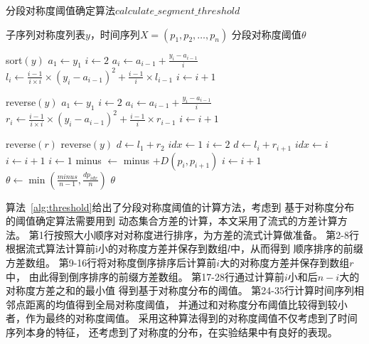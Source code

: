 \begin{algorithm}[t]
  \caption{分段对称度阈值确定算法$calculate\_segment\_threshold$}
  \label{alg:threshold}
  \small
  \begin{algorithmic}
    \REQUIRE 子序列对称度列表$y$，时间序列$X=\left(p_{1}, p_{2}, \dots, p_{n}\right)$
    \ENSURE 分段对称度阈值$\theta$

    \STATE sort$(y)$
    \STATE $a_1 \leftarrow y_1$
    \STATE $i \leftarrow 2$
    \STATE $a_i \leftarrow a_{i-1}+\frac{y_i-a_{i-1}}{i}$
    \STATE $l_i \leftarrow \frac{i-1}{i \times i} \times(y_i-a_{i-1})^{2}+\frac{i-1}{i} \times l_{i-1}$
    \STATE $i \leftarrow i+1$
    \ENDWHILE

    \STATE reverse$(y)$
    \STATE $a_1 \leftarrow y_1$
    \STATE $i \leftarrow 2$
    \STATE $a_i \leftarrow a_{i-1}+\frac{y_i-a_{i-1}}{i}$
    \STATE $r_i \leftarrow \frac{i-1}{i \times i} \times (y_i-a_{i-1})^{2}+\frac{i-1}{i} \times r_{i-1}$
    \STATE $i \leftarrow i+1$
    \ENDWHILE

    \STATE reverse$(r)$
    \STATE reverse$(y)$
    \STATE $d \leftarrow l_1 + r_2$
    \STATE $idx \leftarrow 1$
    \STATE $i \leftarrow 2$
    \STATE $d \leftarrow l_i + r_{i+1}$
    \STATE $idx \leftarrow i$
    \ENDIF
    \STATE $i \leftarrow i+1$
    \ENDWHILE
    \STATE $i \leftarrow 1$
    \STATE minus $\leftarrow$ minus $+D\left(p_{i}, p_{i+1}\right)$
    \STATE $i \leftarrow i+1$
    \ENDWHILE
    \STATE $\theta \leftarrow \min \left(\frac{minus}{n-1}, \frac{dp_{idx}}{n}\right)$
    \RETURN $\theta$
  \end{algorithmic}
\end{algorithm}

算法~\ref{alg:threshold}给出了分段对称度阈值的计算方法，考虑到
基于对称度分布的阈值确定算法需要用到
动态集合方差的计算，本文采用了流式的方差计算方法。
第1行按照大小顺序对对称度进行排序，为方差的流式计算做准备。
第2-8行根据流式算法计算前i小的对称度方差并保存到数组$l$中，从而得到
顺序排序的前缀方差数组。
第9-16行将对称度倒序排序后计算前$i$大的对称度方差并保存到数组$r$中，
由此得到倒序排序的前缀方差数组。
第17-28行通过计算前$i$小和后$n-i$大的对称度方差之和的最小值
得到基于对称度分布的阈值。
第24-35行计算时间序列相邻点距离的均值得到全局对称度阈值，
并通过和对称度分布阈值比较得到较小者，作为最终的对称度阈值。
采用这种算法得到的对称度阈值不仅考虑到了时间序列本身的特征，
还考虑到了对称度的分布，在实验结果中有良好的表现。

